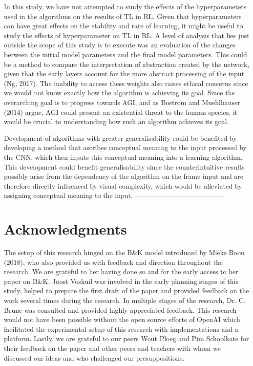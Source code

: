In this study, we have not attempted to study the effects of the hyperparameters used in the algorithms on the results of TL in RL. Given that hyperparameters can have great effects on the stability and rate of learning, it might be useful to study the effects of hyperparameter on TL in RL.
A level of analysis that lies just outside the scope of this study is to execute was an evaluation of the changes between the initial model parameters and the final model parameters. This could be a method to compare the interpretation of abstraction created by the network, given that the early layers account for the more abstract processing of the input (Ng, 2017). The inability to access these weights also raises ethical concerns since we would not know exactly how the algorithm is achieving its goal. Since the overarching goal is to progress towards AGI, and as Bostrom and Muehlhauser (2014) argue, AGI could present an existential threat to the human species, it would be crucial to understanding how such an algorithm achieves its goal. 

Development of algorithms with greater generalisability could be benefited by developing a method that ascribes conceptual meaning to the input processed by the CNN, which then inputs this conceptual meaning into a learning algorithm. This development could benefit generalisability since the counterintuitive results possibly arise from the dependency of the algorithm on the frame input and are therefore directly influenced by visual complexity, which would be alleviated by assigning conceptual meaning to the input. 
---------------------------------------
\section{Acknowledgments}
The setup of this research hinged on the B\&K model introduced by Mieke Boon (2018), who also provided us with feedback and direction throughout the research. We are grateful to her having done so and for the early access to her paper on B\&K. 
Joost Voskuil was involved in the early planning stages of this study, helped to prepare the first draft of the paper and provided feedback on the work several times during the research. In multiple stages of the research, Dr. C. Brune was consulted and provided highly appreciated feedback. 
This research would not have been possible without the open source efforts of OpenAI which facilitated the experimental setup of this research with implementations and a platform. 
Lastly, we are grateful to our peers Wout Ploeg and Pim Schoolkate for their feedback on the paper and other peers and teachers with whom we discussed our ideas and who challenged our presuppositions. 


